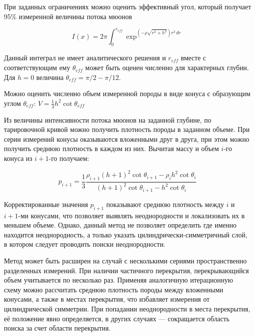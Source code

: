 При заданных ограничениях можно оценить эффективный угол, который получает 95\% измеренной величины потока мюонов

\begin{equation}
I(x) = 2 \pi \int_{0}^{r_{eff}} \exp^{\left( - \rho \sqrt{r^2 + h^2} \right) r^2 \, dr}
\end{equation}

Данный интеграл не имеет аналитического решения и $r_{eff}$ вместе с соответствующим ему $\theta_{eff}$ может быть 
оценен численно для характерных глубин. Для $h=0$ 
величина $\theta_{eff} = \pi / 2 - \pi / 12 $. 

Можно оценить численно объем измеренной породы в виде конуса с образующим углом
 $\theta_{eff}$: $V = \frac{1}{3} h^2 \cot{\theta_{eff}} $

Из величины интенсивности потока мюонов на заданной глубине, по тарировочной кривой можно получить плотность породы в 
заданном объеме. При серии измерений конусы оказываются вложенными друг в друга, при этом можно получить среднюю 
плотность в каждом из них. Вычитая массу и объем $i$-го конуса из $i+1$-го получаем: 

\begin{equation}
p_{i+1} = \frac{1}{3} \frac{\rho_{i+1} \left(h+1\right)^2 \cot{\theta_{i+1}} - \rho_{i} h^2 \cot{\theta_{i}} }{\left(h+1\right)^2 \cot{\theta_{i+1}} - h^2 \cot{\theta_{i}} }
\end{equation}

Корректированные значения $p_{i+1}$ показывают среднюю плотность между $i$ и $i+1$-ми конусами, что позволяет
выявлять неоднородности и локализовать их в меньшем объеме. Однако, данный метод не позволяет определить где именно 
находится неоднородность, а только указать цилиндрически-симметричный слой, в котором следует проводить поиски неоднородности.

Метод может быть расширен на случай с несколькими сериями пространственно разделенных измерений. При наличии 
частичного перекрытия, перекрывающийся объем учитывается по несколько раз. Применяя аналогичную итерационную схему 
можно рассчитать среднюю плотность породы между вложенными конусами, а также в местах перекрытия, что избавляет 
измерения от цилиндрической симметрии. При попадании неоднородности в места перекрытия, её положение явно определяется, 
в других случаях --- сокращается область поиска за счет области перекрытия.

\clearpage